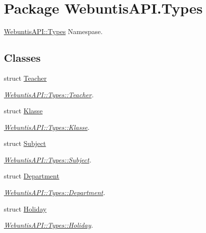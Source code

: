 \hypertarget{namespace_webuntis_a_p_i_1_1_types}{\section{Package Webuntis\-A\-P\-I.\-Types}
\label{namespace_webuntis_a_p_i_1_1_types}
}


\hyperlink{namespace_webuntis_a_p_i_1_1_types}{Webuntis\-A\-P\-I\-::\-Types} Namespase.  


\subsection*{Classes}
\begin{DoxyCompactItemize}
\item 
struct \hyperlink{struct_webuntis_a_p_i_1_1_types_1_1_teacher}{Teacher}
\begin{DoxyCompactList}\small\item\em \hyperlink{struct_webuntis_a_p_i_1_1_types_1_1_teacher}{Webuntis\-A\-P\-I\-::\-Types\-::\-Teacher}. \end{DoxyCompactList}\item 
struct \hyperlink{struct_webuntis_a_p_i_1_1_types_1_1_klasse}{Klasse}
\begin{DoxyCompactList}\small\item\em \hyperlink{struct_webuntis_a_p_i_1_1_types_1_1_klasse}{Webuntis\-A\-P\-I\-::\-Types\-::\-Klasse}. \end{DoxyCompactList}\item 
struct \hyperlink{struct_webuntis_a_p_i_1_1_types_1_1_subject}{Subject}
\begin{DoxyCompactList}\small\item\em \hyperlink{struct_webuntis_a_p_i_1_1_types_1_1_subject}{Webuntis\-A\-P\-I\-::\-Types\-::\-Subject}. \end{DoxyCompactList}\item 
struct \hyperlink{struct_webuntis_a_p_i_1_1_types_1_1_department}{Department}
\begin{DoxyCompactList}\small\item\em \hyperlink{struct_webuntis_a_p_i_1_1_types_1_1_department}{Webuntis\-A\-P\-I\-::\-Types\-::\-Department}. \end{DoxyCompactList}\item 
struct \hyperlink{struct_webuntis_a_p_i_1_1_types_1_1_holiday}{Holiday}
\begin{DoxyCompactList}\small\item\em \hyperlink{struct_webuntis_a_p_i_1_1_types_1_1_holiday}{Webuntis\-A\-P\-I\-::\-Types\-::\-Holiday}. \end{DoxyCompactList}\item 

\end{DoxyCompactItemize}
